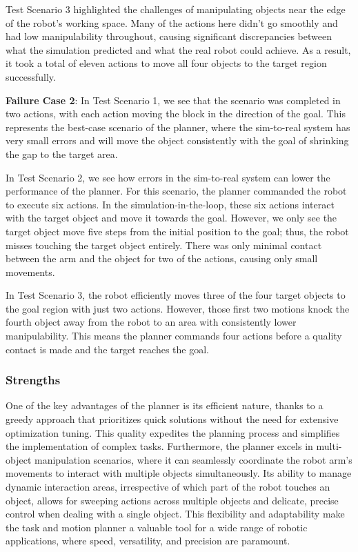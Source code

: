 Test Scenario 3 highlighted the challenges of manipulating objects near the edge of the robot's working space. Many of the actions here didn't go smoothly and had low manipulability throughout, causing significant discrepancies between what the simulation predicted and what the real robot could achieve. As a result, it took a total of eleven actions to move all four objects to the target region successfully.

\textbf{Failure Case 2}: In Test Scenario 1, we see that the scenario was completed in two actions, with each action moving the block in the direction of the goal. This represents the best-case scenario of the planner, where the sim-to-real system has very small errors and will move the object consistently with the goal of shrinking the gap to the target area. 

In Test Scenario 2,  we see how errors in the sim-to-real system can lower the performance of the planner. For this scenario, the planner commanded the robot to execute six actions. In the simulation-in-the-loop, these six actions interact with the target object and move it towards the goal. However, we only see the target object move five steps from the initial position to the goal; thus, the robot misses touching the target object entirely. There was only minimal contact between the arm and the object for two of the actions, causing only small movements. 

In Test Scenario 3, the robot efficiently moves three of the four target objects to the goal region with just two actions. However, those first two motions knock the fourth object away from the robot to an area with consistently lower manipulability. This means the planner commands four actions before a quality contact is made and the target reaches the goal.
\subsubsection{Strengths}
One of the key advantages of the planner is its efficient nature, thanks to a greedy approach that prioritizes quick solutions without the need for extensive optimization tuning. This quality expedites the planning process and simplifies the implementation of complex tasks. Furthermore, the planner excels in multi-object manipulation scenarios, where it can seamlessly coordinate the robot arm's movements to interact with multiple objects simultaneously. Its ability to manage dynamic interaction areas, irrespective of which part of the robot touches an object, allows for sweeping actions across multiple objects and delicate, precise control when dealing with a single object. This flexibility and adaptability make the task and motion planner a valuable tool for a wide range of robotic applications, where speed, versatility, and precision are paramount.

